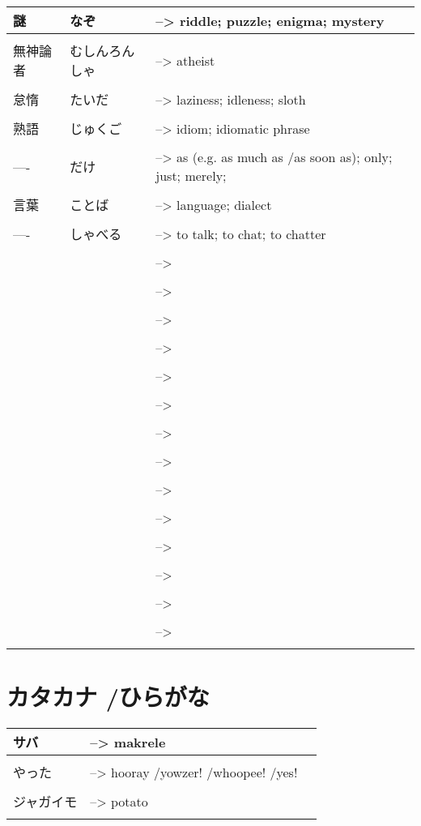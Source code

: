 \documentclass{article}
\begin{document}
\begin{tabular}{ l | l p{14cm}  }
謎 &なぞ &--> riddle; puzzle; enigma; mystery \\ \hline\\[-1em]
無神論者 &むしんろんしゃ &--> atheist \\ \hline\\[-1em]
怠惰 &たいだ &--> laziness; idleness; sloth \\ \hline\\[-1em]
熟語 &じゅくご &--> idiom; idiomatic phrase \\ \hline\\[-1em]
---- &だけ &--> as (e.g. as much as /as soon as); only; just; merely; \\ \hline\\[-1em]
言葉 &ことば &--> language; dialect \\ \hline\\[-1em]
---- &しゃべる &--> to talk; to chat; to chatter \\ \hline\\[-1em]
 & &--> \\ \hline\\[-1em]
 & &--> \\ \hline\\[-1em]
 & &--> \\ \hline\\[-1em]
 & &--> \\ \hline\\[-1em]
 & &--> \\ \hline\\[-1em]
 & &--> \\ \hline\\[-1em]
 & &--> \\ \hline\\[-1em]
 & &--> \\ \hline\\[-1em]
 & &--> \\ \hline\\[-1em]
 & &--> \\ \hline\\[-1em]
 & &--> \\ \hline\\[-1em]
 & &--> \\ \hline\\[-1em]
 & &--> \\ \hline\\[-1em]
 & &--> \\ \hline\\[-1em]
\end{tabular}

\part*{カタカナ /ひらがな}
\begin{tabular}{ p{3cm} | l l }
サバ    &--> makrele \\ \hline\\[-1em]
やった  &--> hooray /yowzer! /whoopee! /yes! \\ \hline\\[-1em]
ジャガイモ &--> potato \\ \hline\\[-1em]
\end{tabular}
\end{document}
